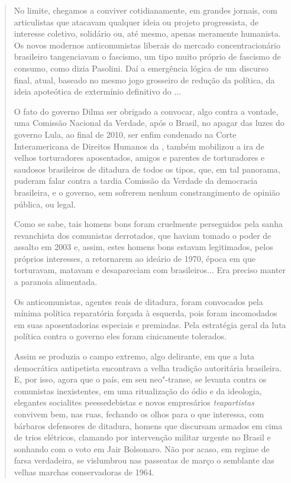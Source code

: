 \begin{quote}
No limite, chegamos a conviver cotidianamente, em grandes jornais, com
articulistas que atacavam qualquer ideia ou projeto progressista, de
interesse coletivo, solidário ou, até mesmo, apenas meramente humanista.
Os novos modernos anticomunistas liberais do mercado concentracionário
brasileiro tangenciavam o fascismo, um tipo muito próprio de fascismo de
consumo, como dizia Pasolini. Daí a emergência lógica de um discurso
final, atual, baseado no mesmo jogo grosseiro de redução da política, da
ideia apoteótica de extermínio definitivo do ...

O fato do governo Dilma ser obrigado a convocar, algo contra a vontade,
uma Comissão Nacional da Verdade, após o Brasil, no apagar das luzes do
governo Lula, ao final de 2010, ser enfim condenado na Corte
Interamericana de Direitos Humanos da , também mobilizou a ira de
velhos torturadores aposentados, amigos e parentes de torturadores e
saudosos brasileiros de ditadura de todos os tipos, que, em tal
panorama, puderam falar contra a tardia Comissão da Verdade da
democracia brasileira, e o governo, sem sofrerem nenhum constrangimento
de opinião pública, ou legal.

Como se sabe, tais homens bons foram cruelmente perseguidos pela sanha
revanchista dos comunistas derrotados, que haviam tomado o poder de
assalto em 2003 e, assim, estes homens bons estavam legitimados, pelos
próprios interesses, a retornarem ao ideário de 1970, época em que
torturavam, matavam e desapareciam com brasileiros... Era preciso manter
a paranoia alimentada.

Os anticomunistas, agentes reais de ditadura, foram convocados pela
mínima política reparatória forçada à esquerda, pois foram incomodados
em suas aposentadorias especiais e premiadas. Pela estratégia geral da
luta política contra o governo eles foram cinicamente tolerados.

Assim se produzia o campo extremo, algo delirante, em que a luta
democrática antipetista encontrava a velha tradição autoritária
brasileira. E, por isso, agora que o país, em seu neo"-transe, se levanta
contra os comunistas inexistentes, em uma ritualização do ódio e da
ideologia, elegantes socialites peessedebistas e novos empresários
\emph{teapartistas} convivem bem, nas ruas, fechando os olhos para o que
interessa, com bárbaros defensores de ditadura, homens que discursam
armados em cima de trios elétricos, clamando por intervenção militar
urgente no Brasil e sonhando com o voto em Jair Bolsonaro. Não por
acaso, em regime de farsa verdadeira, se vislumbrou nas passeatas de
março o semblante das velhas marchas conservadoras de 1964.


\end{quote}
